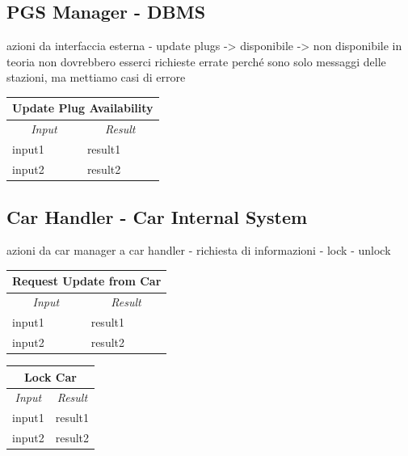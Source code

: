 \documentclass[english]{article}
\begin{document}
\subsection{PGS Manager - DBMS}
azioni da interfaccia esterna
- update plugs 
	-> disponibile 
	-> non disponibile
in teoria non dovrebbero esserci richieste errate perché sono solo messaggi delle stazioni, ma mettiamo casi di errore

\begin{center}
	\begin{tabular}{ | m{6cm} | m{6cm} | }
		\hline 
		\multicolumn{2}{|c|}{\textbf{Update Plug Availability}} \\
		\hline
		\multicolumn{1}{|c|}{\textit{Input}} & \multicolumn{1}{c|}{\textit{Result}} \\
		\hline
		input1 & result1 \\
		\hline
		input2 & result2 \\
		\hline
	\end{tabular}
\end{center}

\subsection{Car Handler - Car Internal System}
azioni da car manager a car handler
- richiesta di informazioni
- lock
- unlock

\begin{center}
	\begin{tabular}{ | m{6cm} | m{6cm} | }
		\hline 
		\multicolumn{2}{|c|}{\textbf{Request Update from Car}} \\
		\hline
		\multicolumn{1}{|c|}{\textit{Input}} & \multicolumn{1}{c|}{\textit{Result}} \\
		\hline
		input1 & result1 \\
		\hline
		input2 & result2 \\
		\hline
	\end{tabular}
\end{center}

\begin{center}
	\begin{tabular}{ | m{6cm} | m{6cm} | }
		\hline 
		\multicolumn{2}{|c|}{\textbf{Lock Car}} \\
		\hline
		\multicolumn{1}{|c|}{\textit{Input}} & \multicolumn{1}{c|}{\textit{Result}} \\
		\hline
		input1 & result1 \\
		\hline
		input2 & result2 \\
		\hline
	\end{tabular}
\end{center}
\end{document}
